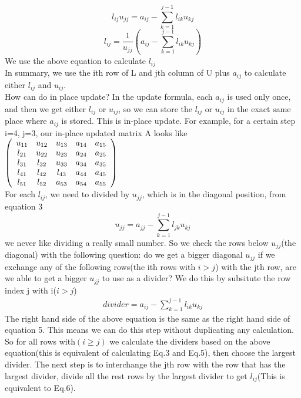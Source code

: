 \documentclass[a4paper]{article}
\begin{document}
\begin{equation}
	  l_{ij}u_{jj} = a_{ij} -\sum_{k=1}^{j-1} l_{ik} u_{kj}	
\end{equation}
\begin{equation}
	  l_{ij} = \frac{1}{u_{jj}}(a_{ij} -\sum_{k=1}^{j-1} l_{ik} u_{kj})	
\end{equation}
We use the above equation to calculate $l_{ij}$\\
In summary, we use the ith row of L and jth column of U plus $a_{ij}$ to calculate either $l_{ij}$ and $u_{ij}$.
\\
How can do in place update? In the update formula, each $a_{ij}$ is used only once, and then we get either $l_{ij}$ or $u_{ij}$, so we can store the $l_{ij}$ or $u_{ij}$  in the exact same place where $a_{ij}$ is stored. This is in-place update.
For example, for a certain step i=4, j=3, our in-place updated matrix A looks like\\
$\left( \begin{array}{ccccc}
u_{11} & u_{12} & 	u_{13} 	 & 	 a_{14} 	& 	a_{15} 	\\
l_{21} & u_{22} & 	u_{23} 	 &	 a_{24} 	& 	a_{25}	\\
l_{31} & l_{32} &   u_{33}   &   a_{34}		&	a_{35}	\\
l_{41} & l_{42} & 	l_{43} 	 &   a_{44} 	& 	a_{45}	\\
l_{51} & l_{52} & 	a_{53}	 & 	 a_{54} 	& 	a_{55}	\\\end{array} \right)\\
$
\\
For each $l_{ij}$, we need to divided by $u_{jj}$, which is in the diagonal position, from equation 3 
\begin{equation}
	u_{jj} = a_{jj} - \sum_{k=1}^{j-1} l_{jk} u_{kj}
\end{equation}
we never like dividing a really small number. So we check the rows below $u_{jj}$(the diagonal) with the following question: do we get a bigger diagonal $u_{jj}$ if we exchange any of the following rows(the ith rows with $i>j$) with the jth row, are we able to get a bigger $u_{jj}$ to use as a divider? We do this by subsitute the row index j with i($i > j$)
\begin{align*}
	divider = a_{ij} - \sum_{k=1}^{j-1} l_{ik} u_{kj}
\end{align*}
The right hand side of the above equation is the same as the right hand side of equation 5. This means we can do this step without duplicating any calculation. So for all rows with$(i \geq j)$ we calculate the dividers based on the above equation(this is equivalent of calculating Eq.3 and Eq.5), then choose the largest divider. The next step is to interchange the jth row with the row that has the largest divider, divide all the rest rows by the largest divider to get $l_{ij}$(This is equivalent to Eq.6).\\
\end{document}
